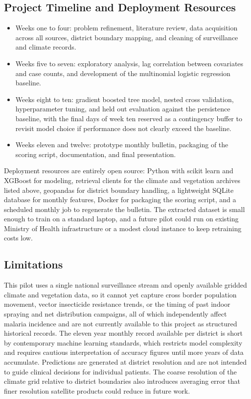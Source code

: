 \documentclass[11pt]{article}
\begin{document}
\subsection{Project Timeline and Deployment Resources}
\begin{itemize}
\item Weeks one to four: problem refinement, literature review, data acquisition across all sources, district boundary mapping, and cleaning of surveillance and climate records.
\item Weeks five to seven: exploratory analysis, lag correlation between covariates and case counts, and development of the multinomial logistic regression baseline.
\item Weeks eight to ten: gradient boosted tree model, nested cross validation, hyperparameter tuning, and held out evaluation against the persistence baseline, with the final days of week ten reserved as a contingency buffer to revisit model choice if performance does not clearly exceed the baseline.
\item Weeks eleven and twelve: prototype monthly bulletin, packaging of the scoring script, documentation, and final presentation.
\end{itemize}
Deployment resources are entirely open source: Python with scikit learn and XGBoost for modeling, retrieval clients for the climate and vegetation archives listed above, geopandas for district boundary handling, a lightweight SQLite database for monthly features, Docker for packaging the scoring script, and a scheduled monthly job to regenerate the bulletin. The extracted dataset is small enough to train on a standard laptop, and a future pilot could run on existing Ministry of Health infrastructure or a modest cloud instance to keep retraining costs low.

\subsection*{Limitations}
This pilot uses a single national surveillance stream and openly available gridded climate and vegetation data, so it cannot yet capture cross border population movement, vector insecticide resistance trends, or the timing of past indoor spraying and net distribution campaigns, all of which independently affect malaria incidence and are not currently available to this project as structured historical records. The eleven year monthly record available per district is short by contemporary machine learning standards, which restricts model complexity and requires cautious interpretation of accuracy figures until more years of data accumulate. Predictions are generated at district resolution and are not intended to guide clinical decisions for individual patients. The coarse resolution of the climate grid relative to district boundaries also introduces averaging error that finer resolution satellite products could reduce in future work.
\end{document}
